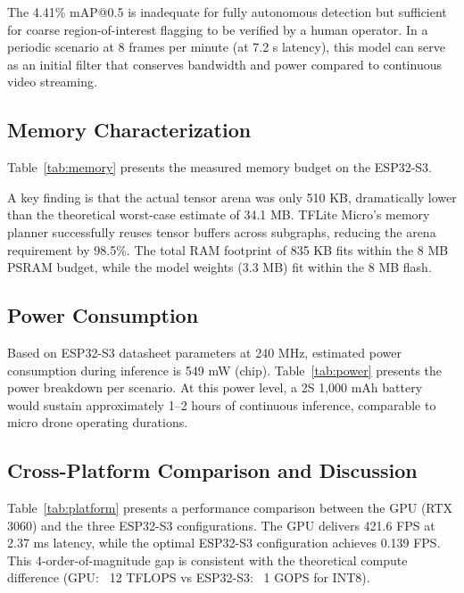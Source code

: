 \documentclass[10pt,twocolumn]{article}
\begin{document}
The 4.41\% mAP@0.5 is inadequate for fully autonomous detection but sufficient for coarse region-of-interest flagging to be verified by a human operator. In a periodic scenario at 8 frames per minute (at 7.2 s latency), this model can serve as an initial filter that conserves bandwidth and power compared to continuous video streaming.

\subsection{Memory Characterization}

Table~\ref{tab:memory} presents the measured memory budget on the ESP32-S3.



A key finding is that the actual tensor arena was only 510 KB, dramatically lower than the theoretical worst-case estimate of 34.1 MB. TFLite Micro's memory planner successfully reuses tensor buffers across subgraphs, reducing the arena requirement by 98.5\%. The total RAM footprint of 835 KB fits within the 8 MB PSRAM budget, while the model weights (3.3 MB) fit within the 8 MB flash.

\subsection{Power Consumption}

Based on ESP32-S3 datasheet parameters at 240 MHz, estimated power consumption during inference is 549 mW (chip). Table~\ref{tab:power} presents the power breakdown per scenario. At this power level, a 2S 1,000 mAh battery would sustain approximately 1--2 hours of continuous inference, comparable to micro drone operating durations.



\subsection{Cross-Platform Comparison and Discussion}

Table~\ref{tab:platform} presents a performance comparison between the GPU (RTX 3060) and the three ESP32-S3 configurations. The GPU delivers 421.6 FPS at 2.37 ms latency, while the optimal ESP32-S3 configuration achieves 0.139 FPS. This 4-order-of-magnitude gap is consistent with the theoretical compute difference (GPU: ~12 TFLOPS vs ESP32-S3: ~1 GOPS for INT8).


\end{document}
